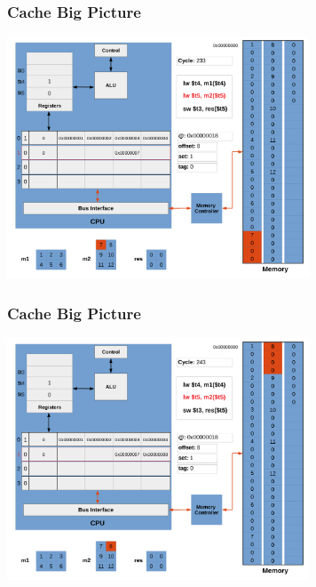 \documentclass{beamer}
\begin{document}
\begin{frame}[fragile]
\frametitle{Cache Big Picture}

\begin{center}
\vspace*{-0.23cm}
\hspace*{-1cm}\includegraphics[width=9cm]{cache11.pdf}
\end{center}

\end{frame}

\begin{frame}[fragile]
\frametitle{Cache Big Picture}

\begin{center}
\vspace*{-0.23cm}
\hspace*{-1cm}\includegraphics[width=9cm]{cache12.pdf}
\end{center}

\end{frame}
\end{document}
